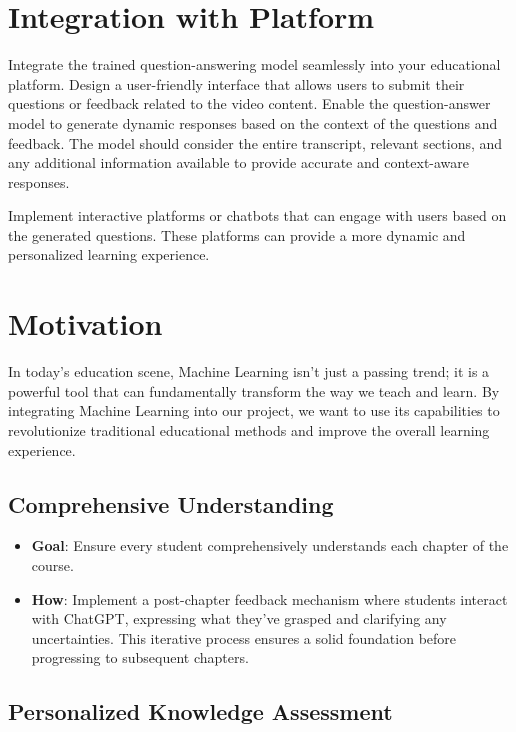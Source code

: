 \section{Integration with Platform}

Integrate the trained question-answering model seamlessly into your educational platform. Design a user-friendly interface that allows users to submit their questions or feedback related to the video content. Enable the question-answer model to generate dynamic responses based on the context of the questions and feedback. The model should consider the entire transcript, relevant sections, and any additional information available to provide accurate and context-aware responses.

Implement interactive platforms or chatbots that can engage with users based on the generated questions. These platforms can provide a more dynamic and personalized learning experience.

\section{Motivation}

In today's education scene, Machine Learning isn't just a passing trend; it is a powerful tool that can fundamentally transform the way we teach and learn. By integrating Machine Learning into our project, we want to use its capabilities to revolutionize traditional educational methods and improve the overall learning experience.

\subsection{Comprehensive Understanding}

\begin{itemize}[label=--]
	\item \textbf{Goal}: Ensure every student comprehensively understands each chapter of the course.
	\item \textbf{How}: Implement a post-chapter feedback mechanism where students interact with ChatGPT, expressing what they've grasped and clarifying any uncertainties. This iterative process ensures a solid foundation before progressing to subsequent chapters.
\end{itemize}

\subsection{Personalized Knowledge Assessment}

